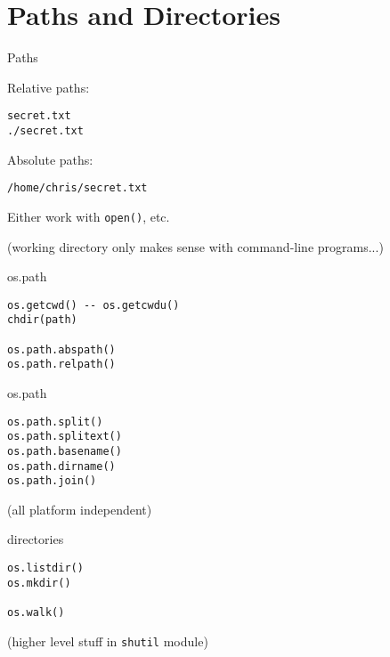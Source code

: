 \documentclass{beamer}
\begin{document}
%
%


\section{Paths and Directories}

\begin{frame}[fragile]{Paths}

{\Large Relative paths:}

\begin{verbatim}
secret.txt
./secret.txt
\end{verbatim}

{\Large Absolute paths:}
\begin{verbatim}
/home/chris/secret.txt
\end{verbatim}

{\Large Either work with \verb|open()|, etc.}

\vfill
(working directory only makes sense with command-line programs...)
\end{frame}

\begin{frame}[fragile]{os.path}

\begin{verbatim}
os.getcwd() -- os.getcwdu()
chdir(path)

os.path.abspath()
os.path.relpath()￼
\end{verbatim}

\end{frame}

\begin{frame}[fragile]{os.path}

\vfill
\begin{verbatim}
os.path.split()
os.path.splitext()
os.path.basename()
os.path.dirname()
os.path.join()
\end{verbatim}

\vfill
(all platform independent)

\end{frame}


\begin{frame}[fragile]{directories}

\vfill
\begin{verbatim}
os.listdir()
os.mkdir()

os.walk()

\end{verbatim}

\vfill
(higher level stuff in \verb|shutil| module)

\end{frame}
\end{document}
